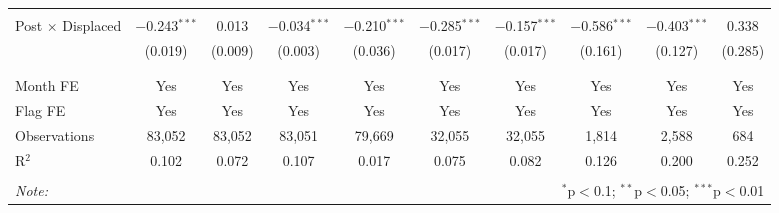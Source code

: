 \documentclass[12pt]{article}
\begin{document}
\begin{landscape}
\begin{table}[H]
\begin{tabular}{@{\extracolsep{1pt}}lccccccccc}
  & & & & & & & & & \\ 
 Post $\times$ Displaced & $-$0.243$^{***}$ & 0.013 & $-$0.034$^{***}$ & $-$0.210$^{***}$ & $-$0.285$^{***}$ & $-$0.157$^{***}$ & $-$0.586$^{***}$ & $-$0.403$^{***}$ & 0.338 \\ 
  & (0.019) & (0.009) & (0.003) & (0.036) & (0.017) & (0.017) & (0.161) & (0.127) & (0.285) \\ 
  & & & & & & & & & \\ 
\hline \\[-1.8ex] 
Month FE & Yes & Yes & Yes & Yes & Yes & Yes & Yes & Yes & Yes \\ 
Flag FE & Yes & Yes & Yes & Yes & Yes & Yes & Yes & Yes & Yes \\ 
Observations & 83,052 & 83,052 & 83,051 & 79,669 & 32,055 & 32,055 & 1,814 & 2,588 & 684 \\ 
R$^{2}$ & 0.102 & 0.072 & 0.107 & 0.017 & 0.075 & 0.082 & 0.126 & 0.200 & 0.252 \\ 
\hline 
\hline \\[-1.8ex] 
\textit{Note:}  & \multicolumn{9}{r}{$^{*}$p$<$0.1; $^{**}$p$<$0.05; $^{***}$p$<$0.01} \\ 
\end{tabular} 
\end{table} 
\end{landscape}
\end{document}
